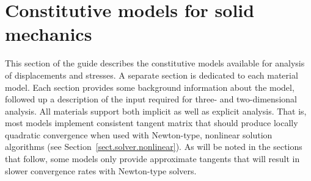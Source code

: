 
\section{Constitutive models for solid mechanics}
This section of the guide describes the constitutive models available 
for analysis of displacements and stresses. A separate section is 
dedicated to each material model. Each section provides some 
background information about the model, followed up a description of 
the input required for three- and two-dimensional analysis.
All materials support both implicit as well as explicit 
analysis. That is, most models implement consistent tangent matrix 
that should produce locally quadratic convergence when used with 
Newton-type, nonlinear solution algorithms 
(see Section~\ref{sect.solver.nonlinear}).
As will be noted in the sections that follow, some models only provide 
approximate tangents that will result in
slower convergence rates with Newton-type solvers.

